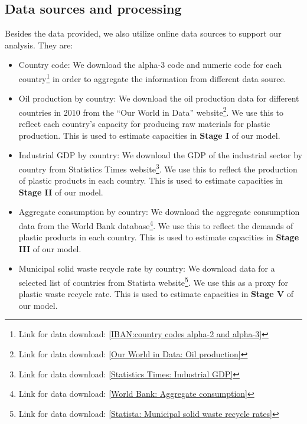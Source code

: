 \documentclass[dvipsnames]{article}
\begin{document}
\subsection{Data sources and processing}
\label{sec:data}
Besides the data provided, we also utilize online data sources to support our analysis. They are:
\begin{itemize}
    \item Country code: We download the alpha-3 code and numeric code for each country\footnote{Link for data download: \href{https://www.iban.com/country-codes}{[IBAN:country codes alpha-2 and alpha-3]}} in order to aggregate the information from different data source. 
    \item Oil production by country: We download the oil production data for different countries in 2010 from the ``Our World in Data'' website\footnote{Link for data download: \href{https://ourworldindata.org/fossil-fuels}{[Our World in Data: Oil production]}}. We use this to reflect each country's capacity for producing raw materials for plastic production. This is used to estimate capacities in \textbf{Stage I} of our model.
    \item Industrial GDP by country: We download the GDP of the industrial sector by country from Statistics Times website\footnote{Link for data download: \href{https://statisticstimes.com/economy/countries-by-gdp-sector-composition.php}{[Statistics Times: Industrial GDP]}}. We use this to reflect the production of plastic products in each country. This is used to estimate capacities in \textbf{Stage II} of our model.
    \item Aggregate consumption by country: We download the aggregate consumption data from the World Bank database\footnote{Link for data download: \href{https://data.worldbank.org/indicator/NE.CON.TOTL.ZS}{[World Bank: Aggregate consumption]}}. We use this to reflect the demands of plastic products in each country.  This is used to estimate capacities in \textbf{Stage III} of our model.
    \item Municipal solid waste recycle rate by country: We download data for a selected list of countries from Statista website\footnote{Link for data download: \href{https://www.statista.com/statistics/1052439/rate-of-msw-recycling-worldwide-by-key-country/}{[Statista: Municipal solid waste recycle rates]}}. We use this as a proxy for plastic waste recycle rate.  This is used to estimate capacities in \textbf{Stage V} of our model.
    
\end{itemize}
\end{document}
